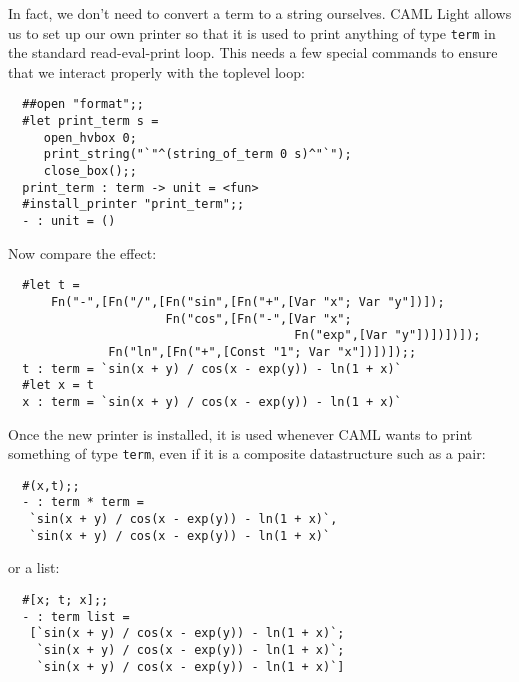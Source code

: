 In fact, we don't need to convert a term to a string ourselves. CAML Light
allows us to set up our own printer so that it is used to print anything of
type {\tt term} in the standard read-eval-print loop. This needs a few special
commands to ensure that we interact properly with the toplevel
loop:

\begin{boxed}\begin{verbatim}
  ##open "format";;
  #let print_term s =
     open_hvbox 0;
     print_string("`"^(string_of_term 0 s)^"`");
     close_box();;
  print_term : term -> unit = <fun>
  #install_printer "print_term";;
  - : unit = ()
\end{verbatim}\end{boxed}

\noindent Now compare the effect:

\begin{boxed}\begin{verbatim}
  #let t =
      Fn("-",[Fn("/",[Fn("sin",[Fn("+",[Var "x"; Var "y"])]);
                      Fn("cos",[Fn("-",[Var "x";
                                        Fn("exp",[Var "y"])])])]);
              Fn("ln",[Fn("+",[Const "1"; Var "x"])])]);;
  t : term = `sin(x + y) / cos(x - exp(y)) - ln(1 + x)`
  #let x = t
  x : term = `sin(x + y) / cos(x - exp(y)) - ln(1 + x)`
\end{verbatim}\end{boxed}

Once the new printer is installed, it is used whenever CAML wants to print
something of type {\tt term}, even if it is a composite datastructure
such as a pair:

\begin{boxed}\begin{verbatim}
  #(x,t);;
  - : term * term =
   `sin(x + y) / cos(x - exp(y)) - ln(1 + x)`,
   `sin(x + y) / cos(x - exp(y)) - ln(1 + x)`
\end{verbatim}\end{boxed}

\noindent or a list:

\begin{boxed}\begin{verbatim}
  #[x; t; x];;
  - : term list =
   [`sin(x + y) / cos(x - exp(y)) - ln(1 + x)`;
    `sin(x + y) / cos(x - exp(y)) - ln(1 + x)`;
    `sin(x + y) / cos(x - exp(y)) - ln(1 + x)`]
\end{verbatim}\end{boxed}

